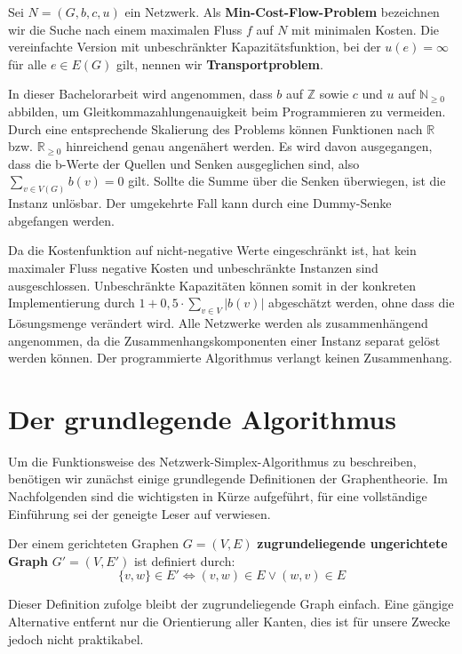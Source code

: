 \begin{defn}Sei $N=(G,b,c,u)$ ein Netzwerk. Als \textbf{Min-Cost-Flow-Problem} bezeichnen wir die Suche nach einem maximalen Fluss $f$ auf $N$ mit minimalen Kosten. Die vereinfachte Version mit unbeschränkter Kapazitätsfunktion, bei der $u(e)=\infty$ für alle $e\in E(G)$ gilt, nennen wir \textbf{Transportproblem}.\end{defn}

In dieser Bachelorarbeit wird angenommen, dass $b$ auf $\mathbb{Z}$ sowie $c$ und $u$ auf $\mathbb{N}_{\geq0}$ abbilden, um Gleitkommazahlungenauigkeit beim Programmieren zu vermeiden. Durch eine entsprechende Skalierung des Problems können Funktionen nach $\mathbb{R}$ bzw. $\mathbb{R}_{\geq 0}$ hinreichend genau angenähert werden. Es wird davon ausgegangen, dass die b-Werte der Quellen und Senken ausgeglichen sind, also $\sum_{v\in V(G)} b(v) = 0$ gilt. Sollte die Summe über die Senken überwiegen, ist die Instanz unlösbar. Der umgekehrte Fall kann durch eine Dummy-Senke\footnotemark{} abgefangen werden.


Da die Kostenfunktion auf nicht-negative Werte eingeschränkt ist, hat kein maximaler Fluss negative Kosten und unbeschränkte Instanzen sind ausgeschlossen. Unbeschränkte Kapazitäten können somit in der konkreten Implementierung durch $1+0,5\cdot\sum_{v\in V} |b(v)|$ abgeschätzt werden, ohne dass die Lösungsmenge verändert wird. Alle Netzwerke werden als zusammenhängend angenommen, da die Zusammenhangskomponenten einer Instanz separat gelöst werden können. Der programmierte Algorithmus verlangt keinen Zusammenhang.

\section{Der grundlegende Algorithmus}\label{ch:alg}
Um die Funktionsweise des Netzwerk-Simplex-Algorithmus zu beschreiben, benötigen wir zunächst einige grundlegende Definitionen der Graphentheorie. Im Nachfolgenden sind die wichtigsten in Kürze aufgeführt, für eine vollständige Einführung sei der geneigte Leser auf \cite{Alma} verwiesen.

\begin{defn}Der einem gerichteten Graphen $G=(V,E)$ \textbf{zugrundeliegende ungerichtete Graph} $G'=(V,E')$ ist definiert durch:
\begin{equation*}\{v,w\}\in E' \iff (v,w) \in E \lor (w,v) \in E\end{equation*} \end{defn}
\begin{anm}Dieser Definition zufolge bleibt der zugrundeliegende Graph einfach. Eine gängige Alternative entfernt nur die Orientierung aller Kanten, dies ist für unsere Zwecke jedoch nicht praktikabel.\end{anm}

